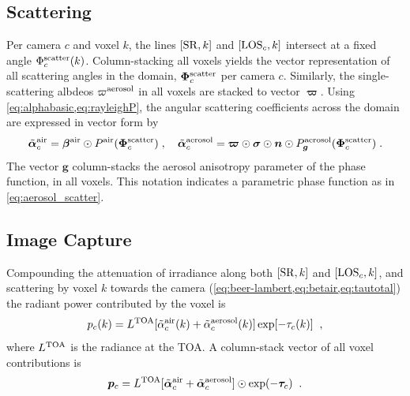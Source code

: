 \documentclass[10pt,letterpaper]{article}
\newcommand{\vect}[1]{\bm{#1}}
\begin{document}
\subsection{Scattering}
\label{sec:scattering}

Per camera $c$ and voxel $k$, the lines $[{\rm SR},k]$ and $[{\rm
  LOS}_c,k]$ intersect at a fixed angle $\Phi^{\rm scatter}_c(k)$.
Column-stacking all voxels yields the vector representation of all
scattering angles in the domain, $\vect{\Phi}^{\rm scatter}_c$ per
camera $c$. Similarly, the single-scattering albdeos $\varpi^{\rm
  aerosol}$ in all voxels are stacked to vector $\vect{\varpi}$.
Using \cref{eq:alphabasic,eq:rayleighP}, the angular scattering
coefficients across the domain are expressed in vector form by
\begin{equation}
  \tilde{\vect{\alpha}}^{\rm air}_c =
  \vect{\beta}^{\rm air} \odot P^{\rm air}(\vect{\Phi}^{\rm scatter}_c)\;,\quad
  \tilde{\vect{\alpha}}^{\rm aerosol}_c = \vect{\varpi}\odot
  \vect{\sigma} \odot {\bm n} \odot P^{\rm aerosol}_{\bm
    g}(\vect{\Phi}^{\rm scatter}_c) \;.
  \label{eq:alpha_matrix}
\end{equation}
The vector ${\bm g}$ column-stacks the aerosol anisotropy parameter of
the phase function, in all voxels. This notation indicates a
parametric phase function as in \cref{eq:aerosol_scatter}.



\subsection{Image Capture}
\label{sec:captured-image}

Compounding the attenuation of irradiance along both $[{\rm SR},k]$
and $[{\rm LOS}_c,k]$, and scattering by voxel $k$ towards the camera
(\cref{eq:beer-lambert,eq:betair,eq:tautotal}) the radiant power
contributed by the voxel is
\begin{equation}
  p_c(k)= L^{\rm TOA}
  [\tilde{\alpha}^{\rm air}_c(k) + \tilde{\alpha}^{\rm aerosol}_c(k)]
  \exp[-\tau_c(k)]
  \;\;,
  \label{eq:ick}
\end{equation}
where $L^{\rm TOA}$ is the radiance at the TOA. A column-stack vector
of all voxel contributions is
\begin{equation}
  {\bm p}_c= L^{\rm TOA}
  [\tilde{\vect{\alpha}}^{\rm air}_c + \tilde{\vect{\alpha}}^{\rm aerosol}_c]
  \odot \exp(-\vect{\tau}_c)
  \;\;.
  \label{eq:pc}
\end{equation}
\end{document}
